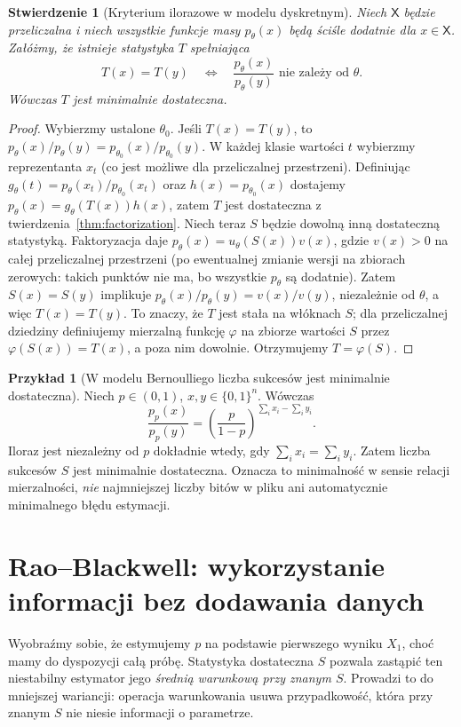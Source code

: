 \documentclass[11pt,a4paper,oneside]{report}
\numberwithin{equation}{chapter}
\theoremstyle{plain}
\newtheorem{stwierdzenie}[twierdzenie]{Stwierdzenie}
\theoremstyle{definition}
\newtheorem{przyklad}{Przykład}[chapter]
\theoremstyle{remark}
\begin{document}
\begin{stwierdzenie}[Kryterium ilorazowe w modelu dyskretnym]
\label{prop:minimal-discrete}
Niech $\mathsf X$ będzie przeliczalna i niech wszystkie funkcje
masy $p_\theta(x)$ będą \emph{ściśle dodatnie} dla $x\in\mathsf X$.
Załóżmy, że istnieje statystyka $T$ spełniająca
\[
T(x)=T(y)\quad\Longleftrightarrow\quad
\frac{p_\theta(x)}{p_\theta(y)}\text{ nie zależy od }\theta.
\]
Wówczas $T$ jest minimalnie dostateczna.
\end{stwierdzenie}
\begin{proof}
Wybierzmy ustalone $\theta_0$. Jeśli $T(x)=T(y)$, to
$p_\theta(x)/p_\theta(y)=p_{\theta_0}(x)/p_{\theta_0}(y)$.
W każdej klasie wartości $t$ wybierzmy reprezentanta $x_t$
(co jest możliwe dla przeliczalnej przestrzeni). Definiując
$g_\theta(t)=p_\theta(x_t)/p_{\theta_0}(x_t)$ oraz
$h(x)=p_{\theta_0}(x)$ dostajemy
$p_\theta(x)=g_\theta(T(x))h(x)$, zatem $T$ jest dostateczna
z twierdzenia~\ref{thm:factorization}.
Niech teraz $S$ będzie dowolną inną dostateczną statystyką.
Faktoryzacja daje
$p_\theta(x)=u_\theta(S(x))v(x)$, gdzie $v(x)>0$
na całej przeliczalnej przestrzeni (po ewentualnej zmianie
wersji na zbiorach zerowych: takich punktów nie ma, bo wszystkie
$p_\theta$ są dodatnie). Zatem $S(x)=S(y)$ implikuje
$p_\theta(x)/p_\theta(y)=v(x)/v(y)$, niezależnie od $\theta$,
a więc $T(x)=T(y)$. To znaczy, że $T$ jest stała na włóknach
$S$; dla przeliczalnej dziedziny definiujemy mierzalną funkcję
$\varphi$ na zbiorze wartości $S$ przez $\varphi(S(x))=T(x)$,
a poza nim dowolnie. Otrzymujemy $T=\varphi(S)$.
\end{proof}

\begin{przyklad}[W modelu Bernoulliego liczba sukcesów jest minimalnie dostateczna]
Niech $p\in(0,1)$, $x,y\in\{0,1\}^n$. Wówczas
\[
\frac{p_p(x)}{p_p(y)}
=\left(\frac p{1-p}\right)^{\sum_i x_i-\sum_i y_i}.
\]
Iloraz jest niezależny od $p$ dokładnie wtedy, gdy
$\sum_i x_i=\sum_i y_i$. Zatem liczba sukcesów $S$ jest
minimalnie dostateczna. Oznacza to minimalność w sensie
relacji mierzalności, \emph{nie} najmniejszej liczby bitów w pliku
ani automatycznie minimalnego błędu estymacji.
\end{przyklad}

\section{Rao--Blackwell: wykorzystanie informacji bez dodawania danych}
Wyobraźmy sobie, że estymujemy $p$ na podstawie pierwszego wyniku
$X_1$, choć mamy do dyspozycji całą próbę. Statystyka dostateczna
$S$ pozwala zastąpić ten niestabilny estymator jego \emph{średnią
warunkową przy znanym $S$}. Prowadzi to do mniejszej wariancji:
operacja warunkowania usuwa przypadkowość, która przy znanym $S$
nie niesie informacji o parametrze.
\end{document}
